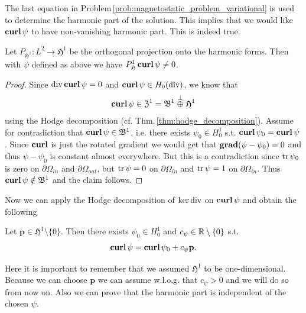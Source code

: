 \documentclass[../master_thesis.tex]{subfiles}
\begin{document}
The last equation in Problem\,\ref{prob:magnetostatic_problem_variational} 
is used to determine the harmonic part of the 
solution. This implies that we would like $\veccurl \psi$ to have 
non-vanishing harmonic part. This is indeed true.
\begin{proposition}
    Let $P_{\mathfrak{H}^1}: L^2 \rightarrow \mathfrak{H}^1$ be the orthogonal
    projection onto the harmonic forms. Then with $\psi$ defined as above 
    we have $P_\mathfrak{H}^1\veccurl \psi \neq 0$.
\end{proposition}
\begin{proof}
    Since $\diver \veccurl \psi = 0$ and $\veccurl \psi \in H_0(\diver)$, we know that 
    \begin{align*}
        \veccurl \psi \in \mathfrak{Z}^1 = \mathfrak{B}^1 \stackrel{\perp}{\oplus} \mathfrak{H}^1
    \end{align*}
    using the Hodge decomposition (cf. Thm.\,\ref{thm:hodge_decomposition}). 
    Assume for contradiction that $\veccurl \psi \in \mathfrak{B}^1$, i.e. there exists 
    $\psi_0 \in H^1_0$ s.t. $\veccurl \psi_0 = \veccurl \psi$. 
    Since $\veccurl$ is just the rotated gradient we would get that 
    $\bm{\grad} (\psi - \psi_0) = 0$ and thus $\psi - \psi_0$ is constant almost 
    everywhere. But this is a contradiction since $\tr \psi_0$ is zero on $\partial\Omega_{in}$ 
    and $\partial \Omega_{out}$, but $\tr \psi = 0$ on $\partial\Omega_{in}$ and 
    $\tr \psi = 1$ on $\partial\Omega_{in}$. 
    Thus $\veccurl \psi \notin \mathfrak{B}^1$ and the claim follows.
\end{proof}
Now we can apply the Hodge decomposition of $\ker \diver$ on
$\veccurl \psi$ and obtain the following
\begin{corollary}
    Let $\mathbf{p}\in \mathfrak{H}^1 \setminus \{ 0 \}$. Then there exists 
    $\psi_0 \in H^1_0$ and $c_\psi \in \real \setminus \{ 0 \}$ s.t. 
    \begin{align}
        \veccurl \psi = \veccurl \psi_0 + c_\psi \mathbf{p}. \label{eq:decomposition_psi}
    \end{align}
\end{corollary}
Here it is important to remember that we assumed $\mathfrak{H}^1$ to be one-dimensional.
Because we can choose $\mathbf{p}$ we can assume w.l.o.g. that $c_\psi > 0$ and 
we will do so from now on. Also we can prove that the harmonic part is 
independent of the chosen $\psi$.
\end{document}
